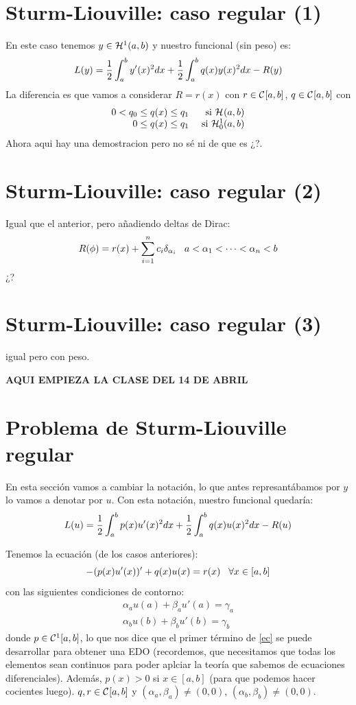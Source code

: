 \section{Sturm-Liouville: caso regular (1)}

En este caso tenemos $y\in\sobolev{1}$ y nuestro funcional (sin peso) es:
\[
L(y)=\frac{1}{2}\integral{a}{b}{y'(x)^2dx}+\frac{1}{2}\integral{a}{b}{q(x)y(x)^2dx}-R(y)
\]
La diferencia es que vamos a considerar $R=r(x)$ con $r\in\continuas$, $q\in\continuas$ con 
\[
\begin{array}{rr}
0<q_0\leq q(x)\leq q_1 & \text{ si } \sobolev{}\\
0\leq q(x) \leq q_1    & \text{ si } \sobolevcero{1}
\end{array}
\]
Ahora aqui hay una demostracion  pero no sé ni de que es ¿?.

\section{Sturm-Liouville: caso regular (2)}

Igual que el anterior, pero añadiendo deltas de Dirac:
\[
R(\phi)=r(x)+\sum_{i=1}^nc_i\delta_{\alpha_i} \espacio a<\alpha_1<\cdots<\alpha_n<b
\]
¿?

\section{Sturm-Liouville: caso regular (3)}
igual pero con peso.

\textbf{AQUI EMPIEZA LA CLASE DEL 14 DE ABRIL}

\section{Problema de Sturm-Liouville regular}

En esta sección vamos a cambiar la notación, lo que antes represantábamos por $y$ lo vamos a denotar por $u$. Con esta notación, nuestro funcional quedaría:
\begin{equation}\label{ff}
L(u)=\frac{1}{2}\integral{a}{b}{p(x)u'(x)^2dx}+\frac{1}{2}\integral{a}{b}{q(x)u(x)^2dx}-R(u)
\end{equation}

Tenemos la ecuación (de los casos anteriores):
\begin{equation}\label{ec}
-(p(x)u'(x))'+q(x)u(x)=r(x) \espacio \forall x\in[a,b]
\end{equation}
con las siguientes condiciones de contorno:
\[
\begin{array}{c}
\alpha_au(a)+\beta_au'(a)=\gamma_a\\
\alpha_bu(b)+\beta_bu'(b)=\gamma_b
\end{array}
\]
donde $p\in\continuas[1]$, lo que nos dice que el primer término de \eqref{ec} se puede desarrollar para obtener una EDO (recordemos, que necesitamos que todas los elementos sean continuos para poder aplciar la teoría que sabemos de ecuaciones diferenciales). Además, $p(x)>0$ si $x\in[a,b]$ (para que podemos hacer cocientes luego). $q,r\in\continuas$ y $(\alpha_a,\beta_a)\neq(0,0)$, $(\alpha_b,\beta_b)\neq(0,0)$.

